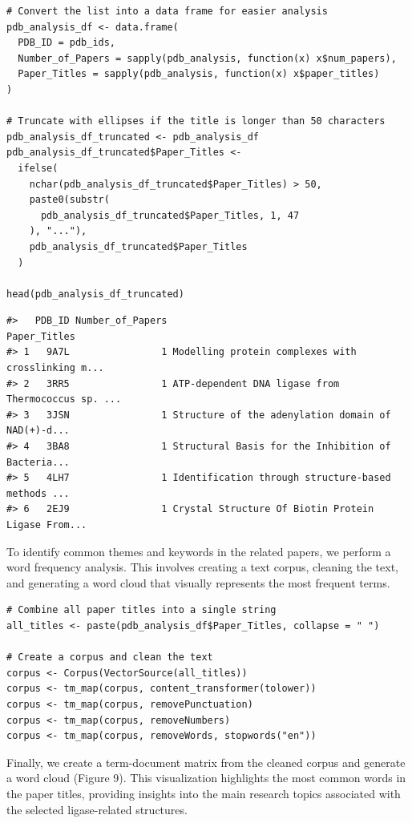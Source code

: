 \begin{verbatim}
# Convert the list into a data frame for easier analysis
pdb_analysis_df <- data.frame(
  PDB_ID = pdb_ids,
  Number_of_Papers = sapply(pdb_analysis, function(x) x$num_papers),
  Paper_Titles = sapply(pdb_analysis, function(x) x$paper_titles)
)

# Truncate with ellipses if the title is longer than 50 characters
pdb_analysis_df_truncated <- pdb_analysis_df
pdb_analysis_df_truncated$Paper_Titles <-
  ifelse(
    nchar(pdb_analysis_df_truncated$Paper_Titles) > 50,
    paste0(substr(
      pdb_analysis_df_truncated$Paper_Titles, 1, 47
    ), "..."),
    pdb_analysis_df_truncated$Paper_Titles
  )

head(pdb_analysis_df_truncated)  
\end{verbatim}

\begin{verbatim}
#>   PDB_ID Number_of_Papers                                       Paper_Titles
#> 1   9A7L                1 Modelling protein complexes with crosslinking m...
#> 2   3RR5                1 ATP-dependent DNA ligase from Thermococcus sp. ...
#> 3   3JSN                1 Structure of the adenylation domain of NAD(+)-d...
#> 4   3BA8                1 Structural Basis for the Inhibition of Bacteria...
#> 5   4LH7                1 Identification through structure-based methods ...
#> 6   2EJ9                1 Crystal Structure Of Biotin Protein Ligase From...
\end{verbatim}

To identify common themes and keywords in the related papers, we perform a word frequency analysis. This involves creating a text corpus, cleaning the text, and generating a word cloud that visually represents the most frequent terms.

\begin{verbatim}
# Combine all paper titles into a single string
all_titles <- paste(pdb_analysis_df$Paper_Titles, collapse = " ")

# Create a corpus and clean the text
corpus <- Corpus(VectorSource(all_titles))
corpus <- tm_map(corpus, content_transformer(tolower))
corpus <- tm_map(corpus, removePunctuation)
corpus <- tm_map(corpus, removeNumbers)
corpus <- tm_map(corpus, removeWords, stopwords("en"))
\end{verbatim}

Finally, we create a term-document matrix from the cleaned corpus and generate a word cloud (Figure 9). This visualization highlights the most common words in the paper titles, providing insights into the main research topics associated with the selected ligase-related structures.

